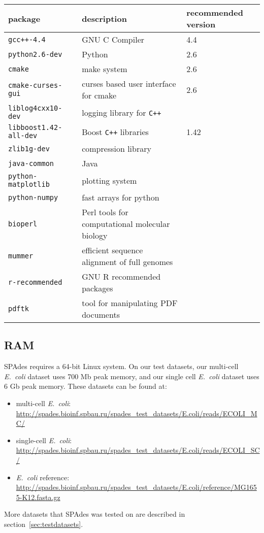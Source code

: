 \documentclass{article}
\def\spades{SPAdes}
\def\ecoli{\it E.~coli}
\begin{document}
\begin{center}
\begin{tabular}{lll}
\toprule
package & description & recommended version\\
\midrule
{\tt gcc++-4.4} & GNU C Compiler & 4.4\\
{\tt python2.6-dev} & Python & 2.6\\
{\tt cmake} & make system & 2.6\\
{\tt cmake-curses-gui} & curses based user interface for cmake & 2.6\\
{\tt liblog4cxx10-dev} & logging library for {\tt C++} & \\
{\tt libboost1.42-all-dev} & Boost {\tt C++} libraries & 1.42\\
{\tt zlib1g-dev} & compression library & \\
{\tt java-common} & Java &\\
{\tt python-matplotlib} & plotting system & \\
{\tt python-numpy} & fast arrays for python & \\
{\tt bioperl} & Perl tools for computational molecular biology & \\
{\tt mummer} & efficient sequence alignment of full genomes & \\
{\tt r-recommended} & GNU R recommended packages & \\
{\tt pdftk} & tool for manipulating PDF documents & \\
\bottomrule
\end{tabular}
\end{center}

\subsection{RAM}
{\spades} requires a 64-bit Linux system.
On our test datasets,
our multi-cell {\ecoli} dataset uses 700 Mb peak memory, and our single cell
{\ecoli} dataset uses 6 Gb peak memory. 
These datasets can be found at:
\begin{itemize}
  \item multi-cell {\ecoli}:\\ \url{http://spades.bioinf.spbau.ru/spades_test_datasets/E.coli/reads/ECOLI_MC/}
  \item single-cell {\ecoli}:\\ \url{http://spades.bioinf.spbau.ru/spades_test_datasets/E.coli/reads/ECOLI_SC/}
  \item {\ecoli} reference:\\ \url{http://spades.bioinf.spbau.ru/spades_test_datasets/E.coli/reference/MG1655-K12.fasta.gz}
\end{itemize}
More datasets that {\spades} was tested on are described in section~\ref{sec:testdatasets}.
\end{document}
